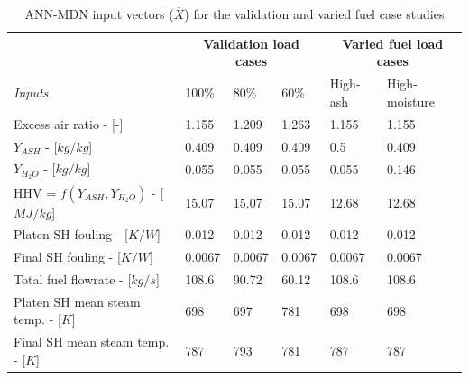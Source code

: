 \documentclass[a4paper,fleqn]{cas-dc}
\begin{document}
\begin{table}[h!]
\caption{ANN-MDN input vectors ($\overline{X}$) for the validation and varied fuel case studies}\label{tbl_inputs}
\begin{tabular*}{\tblwidth}{lp{}p{}p{}p{}p{}}
\toprule
 & \multicolumn{3}{c}{\textbf{Validation load cases}}&\multicolumn{2}{c}{\textbf{Varied fuel load cases}}\\
\textit{Inputs}& 100\%  & 80\% & 60\% & High-ash & High-moisture  \\
\midrule
Excess air ratio - [-] & 1.155 & 1.209 & 1.263 & 1.155 & 1.155  \\
$Y_{ASH}$ - [$kg/kg$] & 0.409 & 0.409 &  0.409 &0.5 & 0.409  \\
$Y_{H_{2}O}$ - [$kg/kg$] & 0.055 & 0.055 & 0.055 & 0.055 & 0.146  \\
HHV = $f(Y_{ASH},Y_{H_{2}O})$ - [$MJ/kg$] & 15.07 & 15.07 & 15.07 & 12.68 & 12.68  \\
Platen SH fouling - [$K/W$]& 0.012 & 0.012 & 0.012 & 0.012 & 0.012  \\
Final SH fouling - [$K/W$] & 0.0067&0.0067 &0.0067 & 0.0067&0.0067  \\
Total fuel flowrate - [$kg/s$] &108.6 & 90.72 & 60.12 &108.6 & 108.6 \\
Platen SH mean steam temp. - [$K$] & 698 &697&781 &698 &698  \\
Final SH mean steam temp. - [$K$]& 787 & 793 &781 &787 &787  \\
\bottomrule
\end{tabular*}
\end{table}  
\end{document}
